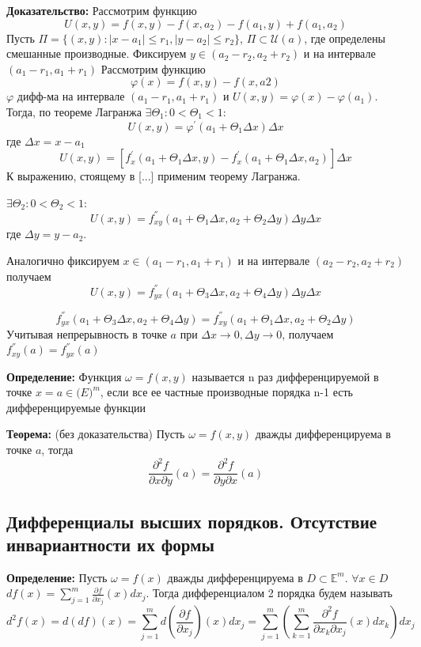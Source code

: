 \documentclass[a4paper,12pt]{article} %
\begin{document}
	\textbf{Доказательство:} Рассмотрим функцию
	\[
		U(x, y) = f(x, y) - f(x, a_2) - f(a_1, y) + f(a_1, a_2)
	\]
	Пусть $\Pi = \{(x, y) : |x - a_1|\leqslant r_1, |y-a_2| \leqslant r_2\}$, $\Pi \subset \mathscr{U}(a)$, где определены смешанные производные. Фиксируем $y\in (a_2-r_2, a_2+r_2)$ и на интервале $(a_1-r_1, a_1+r_1)$ Рассмотрим функцию 
	\[
		\varphi(x) = f(x, y) - f(x, a2)
	\]
	$\varphi$ дифф-ма на интервале $(a_1-r_1, a_1+r_1)$ и $U(x, y) = \varphi(x) - \varphi(a_1)$.
	Тогда, по теореме Лагранжа $\exists \Theta_1: 0<\Theta_1<1$:
	\[
		U(x, y) = \varphi^{'}(a_1 + \Theta_1\Delta x)\Delta x
	\]
	где $\Delta x = x-a_1$
	\[
		U(x, y) = [f^{'}_x(a_1+\Theta_1\Delta x, y)-f^{'}_x(a_1+\Theta_1\Delta x, a_2) ]\Delta x
	\]
	К выражению, стоящему в [...] применим теорему Лагранжа.
	
	 $\exists\Theta_2: 0<\Theta_2<1$:
	\[
		U(x, y) = f^{''}_{xy}(a_1+\Theta_1\Delta x, a_2+\Theta_2\Delta y)\Delta y\Delta x
	\]
	где $\Delta y = y-a_2$.
	\vspace{5mm}
	
	Аналогично фиксируем $x\in(a_1-r_1, a_1+r_1)$ и на интервале $(a_2-r_2, a_2+r_2)$ получаем
	\[
		U(x, y) = f^{''}_{yx}(a_1+\Theta_3\Delta x, a_2+\Theta_4\Delta y)\Delta y\Delta x
	\]
	
	\[
		f^{''}_{yx}(a_1+\Theta_3\Delta x, a_2+\Theta_4\Delta y) = f^{''}_{xy}(a_1+\Theta_1\Delta x, a_2+\Theta_2\Delta y)
	\]
	Учитывая непрерывность в точке $a$ при $\Delta x\to0, \Delta y\to0$, получаем $f^{''}_{xy}(a) = f^{''}_{yx}(a)$
	
	
	\textbf{Определение:} Функция $\omega = f(x, y)$ называется n раз дифференцируемой в точке $x = a\in \mathbb(E)^m$, если все ее частные производные порядка n-1 есть дифференцируемые функции
	\vspace{5mm}
	
	\textbf{Теорема:} (без доказательства) Пусть $\omega = f(x, y)$ дважды дифференцируема в точке $a$, тогда
	\[
		\frac{\partial^2f}{\partial{x}\partial{y}}(a) = \frac{\partial^2f}{\partial{y}\partial{x}}(a)
	\]
	
	\subsection*{Дифференциалы высших порядков. Отсутствие инвариантности их формы}
	
	\textbf{Определение:} Пусть $\omega = f(x)$ дважды дифференцируема в $D \subset \mathbb{E}^m$. $\forall x\in D $ $df(x) = \sum\limits_{j=1}^m\frac{\partial f}{\partial x_j}(x)dx_j$. Тогда дифференциалом 2 порядка будем называть
	\[
		d^2f(x) =d(df)(x) = \sum\limits_{j=1}^md\left(\frac{\partial f}{\partial x_j}\right)(x)dx_j= \sum\limits_{j=1}^m\left(\sum\limits_{k=1}^m
		\frac{\partial^2f}{\partial x_k\partial x_j}(x)dx_k\right)dx_j
	\]
	
\end{document}
